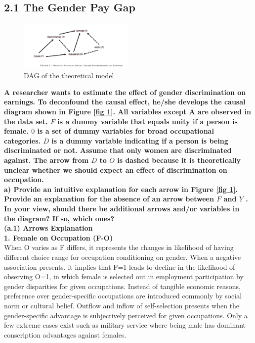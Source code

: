 \documentclass[a4paper,12pt,oneside,English]{article}
\begin{document}
\subsection{2.1 The Gender Pay Gap}
\begin{figure}[h!]
    \centering
    \includegraphics[width=0.5\textwidth]{Image 1.png}
    \caption{DAG of the theoretical model}
    \label{fig 2}
\end{figure}
\textbf{A researcher wants to estimate the effect of gender discrimination on earnings. To deconfound the causal effect, he/she develops the causal diagram shown in Figure \ref{fig 1}. All variables except A are observed in the data set. $F$ is a dummy variable that equals unity if a person is female. $0$ is a set of dummy variables for broad occupational categories. $D$ is a dummy variable indicating if a person is being discriminated or not. Assume that only women are discriminated against. The arrow from $D$ to $O$ is dashed because it is theoretically unclear whether we should expect an effect of discrimination on occupation.}\\
\textbf{a) Provide an intuitive explanation for each arrow in Figure \ref{fig 1}. Provide an explanation for the absence of an arrow between $F$ and $Y$ . In your view, should there be additional arrows and/or variables in the diagram? If so, which ones?}\\

\textbf{(a.1) Arrows Explanation}\\
\textbf{1. Female on Occupation (F-O)}\\
When O varies as F differs, it represents the changes in likelihood of having different choice range for occupation conditioning on gender. When a negative association presents, it implies that F=1 leads to decline in the likelihood of observing O=1, in which female is selected out in employment participation by gender disparities for given occupations. Instead of tangible economic reasons, preference over gender-specific occupations are introduced commonly by social norm or cultural belief. Outflow and inflow of self-selection presents when the gender-specific advantage is subjectively perceived for given occupations. Only a few extreme cases exist such as military service where being male has dominant conscription advantages against females. 
\end{document}
